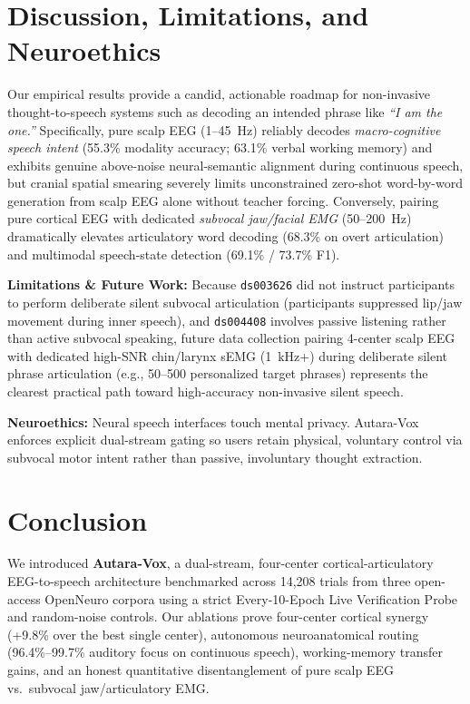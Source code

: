 \documentclass[journal]{IEEEtran}
\begin{document}
\section{Discussion, Limitations, and Neuroethics}
Our empirical results provide a candid, actionable roadmap for non-invasive thought-to-speech systems such as decoding an intended phrase like \emph{``I am the one.''} Specifically, pure scalp EEG (1--45~Hz) reliably decodes \emph{macro-cognitive speech intent} (55.3\% modality accuracy; 63.1\% verbal working memory) and exhibits genuine above-noise neural-semantic alignment during continuous speech, but cranial spatial smearing severely limits unconstrained zero-shot word-by-word generation from scalp EEG alone without teacher forcing. Conversely, pairing pure cortical EEG with dedicated \emph{subvocal jaw/facial EMG} (50--200~Hz) dramatically elevates articulatory word decoding (68.3\% on overt articulation) and multimodal speech-state detection (69.1\% / 73.7\% F1).

\textbf{Limitations \& Future Work:} Because \texttt{ds003626} did not instruct participants to perform deliberate silent subvocal articulation (participants suppressed lip/jaw movement during inner speech), and \texttt{ds004408} involves passive listening rather than active subvocal speaking, future data collection pairing 4-center scalp EEG with dedicated high-SNR chin/larynx sEMG (1~kHz+) during deliberate silent phrase articulation (e.g., 50--500 personalized target phrases) represents the clearest practical path toward high-accuracy non-invasive silent speech.

\textbf{Neuroethics:} Neural speech interfaces touch mental privacy. Autara-Vox enforces explicit dual-stream gating so users retain physical, voluntary control via subvocal motor intent rather than passive, involuntary thought extraction.

\section{Conclusion}
We introduced \textbf{Autara-Vox}, a dual-stream, four-center cortical-articulatory EEG-to-speech architecture benchmarked across 14,208 trials from three open-access OpenNeuro corpora using a strict Every-10-Epoch Live Verification Probe and random-noise controls. Our ablations prove four-center cortical synergy (+9.8\% over the best single center), autonomous neuroanatomical routing (96.4\%--99.7\% auditory focus on continuous speech), working-memory transfer gains, and an honest quantitative disentanglement of pure scalp EEG vs.\ subvocal jaw/articulatory EMG.



\end{document}
